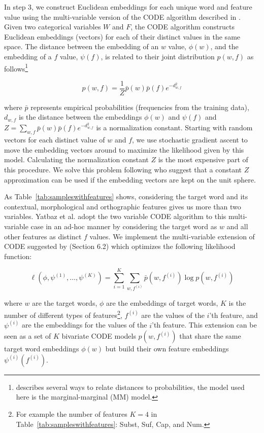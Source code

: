 In step 3, we construct Euclidean embeddings for each unique word and
feature value using the multi-variable version of the CODE algorithm
described in \cite{globerson2007euclidean}.  Given two categorical
variables $W$ and $F$, the CODE algorithm constructs Euclidean
embeddings (vectors) for each of their distinct values in the same
space.  The distance between the embedding of an $w$ value, $\phi(w)$,
and the embedding of a $f$ value, $\psi(f)$, is related to their joint
distribution $p(w, f)$ as
follows\footnote{\cite{globerson2007euclidean} describes several ways
  to relate distances to probabilities, the model used here is the
  marginal-marginal (MM) model.}

\[ p(w,f) = \frac{1}{Z} \bar{p}(w) \bar{p}(f) e^{-d^2_{w,f}} \]

\noindent where $\bar{p}$ represents empirical probabilities
(frequencies from the training data), $d_{w,f}$ is the distance
between the embeddings $\phi(w)$ and $\psi(f)$ and $Z=\sum_{w,f}
\bar{p}(w) \bar{p}(f) e^{-d^2_{w,f}}$ is a normalization constant.
Starting with random vectors for each distinct value of $w$ and $f$,
we use stochastic gradient ascent to move the embedding vectors around
to maximize the likelihood given by this model.  Calculating the
normalization constant $Z$ is the most expensive part of this
procedure.  We solve this problem following \cite{maron2010sphere} who
suggest that a constant $Z$ approximation can be used if the embedding
vectors are kept on the unit sphere.

As Table~\ref{tab:sampleswithfeatures} shows, considering the target
word and its contextual, morphological and orthographic features gives
us more than two variables.  Yatbaz et al. 
 adopt the two
variable CODE algorithm to this multi-variable case in an ad-hoc
manner by considering the target word as $w$ and all other features as
distinct $f$ values.  We implement the multi-variable extension of
CODE suggested by \cite{globerson2007euclidean} (Section 6.2) which
optimizes the following likelihood function:

\[ \ell(\phi, \psi^{(1)}, \ldots, \psi^{(K)}) = 
    \sum_{i=1}^K \sum_{w,f^{(i)}} \bar{p}(w,f^{(i)}) \log p(w,f^{(i)}) \]

\noindent where $w$ are the target words, $\phi$ are the embeddings of
target words, $K$ is the number of different types of
features\footnote{For example the number of features $K=4$ in
  Table~\ref{tab:sampleswithfeatures}: Subst, Suf, Cap, and Num.},
$f^{(i)}$ are the values of the $i$'th feature, and $\psi^{(i)}$ are
the embeddings for the values of the $i$'th feature.  This extension
can be seen as a set of $K$ bivariate CODE models $p(w,f^{(i)})$ that
share the same target word embeddings $\phi(w)$ but build their own
feature embeddings $\psi^{(i)}(f^{(i)})$.

